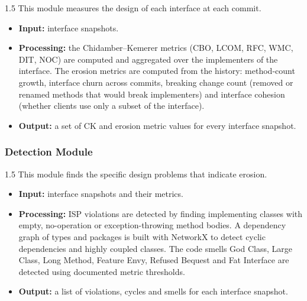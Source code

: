 \documentclass[12pt,a4paper]{article}
\begin{document}
\begin{spacing}{1.5}
\justifying
This module measures the design of each interface at each commit.
 
\begin{itemize}[leftmargin=*,itemsep=2pt]
  \item \textbf{Input:} interface snapshots.
  \item \textbf{Processing:} the Chidamber--Kemerer metrics (CBO, LCOM, RFC, WMC, DIT, NOC) are computed and aggregated over the implementers of the interface. The erosion metrics are computed from the history: method-count growth, interface churn across commits, breaking change count (removed or renamed methods that would break implementers) and interface cohesion (whether clients use only a subset of the interface).
  \item \textbf{Output:} a set of CK and erosion metric values for every interface snapshot.
\end{itemize}
\end{spacing}
 
\subsubsection{Detection Module}
 
\begin{spacing}{1.5}
\justifying
This module finds the specific design problems that indicate erosion.
 
\begin{itemize}[leftmargin=*,itemsep=2pt]
  \item \textbf{Input:} interface snapshots and their metrics.
  \item \textbf{Processing:} ISP violations are detected by finding implementing classes with empty, no-operation or exception-throwing method bodies. A dependency graph of types and packages is built with NetworkX to detect cyclic dependencies and highly coupled classes. The code smells God Class, Large Class, Long Method, Feature Envy, Refused Bequest and Fat Interface are detected using documented metric thresholds.
  \item \textbf{Output:} a list of violations, cycles and smells for each interface snapshot.
\end{itemize}
\end{spacing}
 
\end{document}
